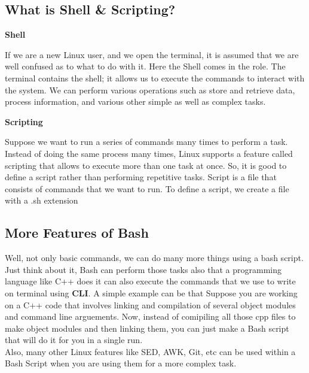 \documentclass[12pt]{article}
\begin{document}
\subsection{What is Shell \& Scripting?}
\vspace{1 em}
    \fbox
    {
    \begin{minipage}{0.4\textwidth}
        \begin{center}
            \large{\textbf{Shell}}
        \end{center}
        If we are a new Linux user, and we open the terminal, it is assumed that we are well confused as to what to do with it. Here the Shell comes in the role.
        The terminal contains the shell; it allows us to execute the commands to interact with the system. We can perform various operations such as store and retrieve data, process information, and various other simple as well as complex tasks.
    \end{minipage}
    }
    \hfill
    \fbox
    {
    \begin{minipage}{0.4\textwidth}
        \begin{center}
            \large{\textbf{Scripting}}
        \end{center}
         Suppose we want to run a series of commands many times to perform a task. Instead of doing the same process many times, Linux supports a feature called scripting that allows to execute more than one task at once. So, it is good to define a script rather than performing repetitive tasks. Script is a file that consists of commands that we want to run. To define a script, we create a file with a .sh extension
    \end{minipage}
    }
\vspace{1 em}

\subsection{More Features of Bash}
\vspace{1 em}
Well, not only basic commands, we can do many more things using a bash script. Just think about it, Bash can perform those tasks also that a programming language like C++ does it can also execute the commands that we use to write on terminal using \textbf{CLI}. A simple example can be that Suppose you are working on a C++ code that involves linking and compilation of several object modules and command line arguements. Now, instead of comipiling all those cpp files to make object modules and then linking them, you can just make a Bash script that will do it for you in a single run. \\
Also, many other Linux features like SED, AWK, Git, etc can be used within a Bash Script when you are using them for a more complex task.
\end{document}
